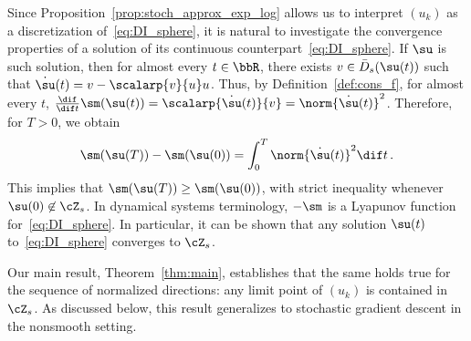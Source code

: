     Since Proposition~\ref{prop:stoch_approx_exp_log} allows us to interpret $(u_k)$ as a discretization of~\eqref{eq:DI_sphere}, it is natural to investigate the convergence properties of a solution of its continuous counterpart~\eqref{eq:DI_sphere}.
  If $\su$ is such solution, then for almost every $t \in \bbR$, there exists $v \in \bar{D}_s(\su(t))$ such that $\dot{\su}(t) = v - \scalarp{v}{u}u$. Thus, by Definition~\ref{def:cons_f}, for almost every $t$, $\frac{\dif }{\dif t}  \sm(\su(t)) = \scalarp{\dot{\su}(t)}{v} = \norm{\dot{\su}(t)}^2$. Therefore, for $T >0$, we obtain
  \begin{equation*}
    \sm(\su(T)) - \sm(\su(0)) = \int_{0}^{T} \norm{\dot{\su}(t)}^2 \dif t \, .
  \end{equation*}
  This implies that $\sm(\su(T)) \geq \sm(\su(0))$, with strict inequality whenever $\su(0) \not \in \cZ_s$. In dynamical systems terminology, $-\sm$ is a Lyapunov function for~\eqref{eq:DI_sphere}. In particular, it can be shown that any solution $\su(t)$ to~\eqref{eq:DI_sphere} converges to $\cZ_s$.

Our main result, Theorem~\ref{thm:main}, establishes that the same holds true for the sequence of normalized directions: any limit point of $(u_k)$ is contained in $\cZ_s$. As discussed below, this result generalizes \cite[Theorem 4.4]{Lyu_Li_maxmargin} to stochastic gradient descent in the nonsmooth setting.

